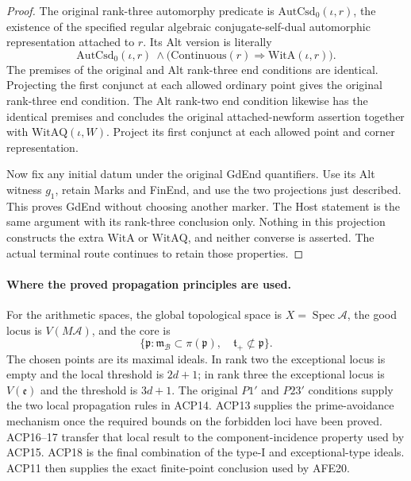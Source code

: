 \documentclass[11pt,a4paper]{article}
\numberwithin{equation}{section}
\theoremstyle{remark}\newtheorem{remark}[theorem]{Remark}
\begin{document}
\begin{proof}
The original rank-three automorphy predicate is
\(\mathrm{AutCsd}_0(\iota,r)\), the existence of the specified
regular algebraic conjugate-self-dual automorphic representation
attached to \(r\).  Its Alt version is literally
\[
 \mathrm{AutCsd}_0(\iota,r)\ \land
             \bigl(\mathrm{Continuous}(r)\Rightarrow
                                      \mathrm{WitA}(\iota,r)\bigr).
                                                        \tag{ACP.28}
\]
The premises of the original and Alt rank-three end conditions
are identical.  Projecting the first conjunct at each allowed
ordinary point gives the original rank-three end condition.
The Alt rank-two end condition likewise has the identical
premises and concludes the original attached-newform assertion
together with \(\mathrm{WitAQ}(\iota,W)\).  Project its first
conjunct at each allowed point and corner representation.

Now fix any initial datum under the original GdEnd quantifiers.
Use its Alt witness \(g_1\), retain Marks and FinEnd, and use
the two projections just described.  This proves GdEnd without
choosing another marker.  The Host statement is the same
argument with its rank-three conclusion only.  Nothing in
this projection constructs the extra \(\mathrm{WitA}\) or
\(\mathrm{WitAQ}\), and neither converse is asserted.
The actual terminal route continues to retain those properties.
\end{proof}

\paragraph{Where the proved propagation principles are used.}
For the arithmetic spaces, the global topological space is
\(X=\operatorname{Spec}\mathcal A\), the good locus is
\(V(M\mathcal A)\), and the core is
\[
 \{\mathfrak p:\mathfrak m_{\mathcal B}
        \subset\pi(\mathfrak p),\quad
                      \mathfrak t_+\not\subset\mathfrak p\}.
                                                        \tag{ACP.29}
\]
The chosen points are its maximal ideals.  In rank two the
exceptional locus is empty and the local threshold is
\(2d+1\); in rank three the exceptional locus is
\(V(\mathfrak e)\) and the threshold is \(3d+1\).
The original \(P1'\) and \(P23'\) conditions supply the
two local propagation rules in ACP14.  ACP13 supplies the
prime-avoidance mechanism once the required bounds on the
forbidden loci have been proved.  ACP16--17 transfer that
local result to the component-incidence property used by
ACP15.  ACP18 is the final combination of the type-I and
exceptional-type ideals.  ACP11 then supplies the exact
finite-point conclusion used by AFE20.
\end{document}
